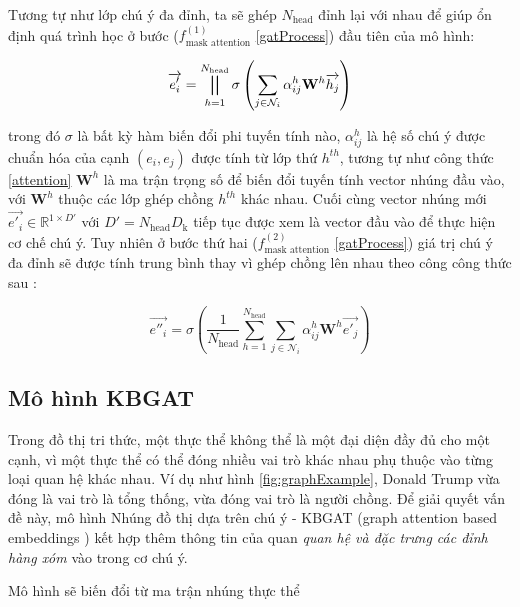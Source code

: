 Tương tự như lớp chú ý đa đỉnh, ta sẽ ghép $N_{\text{head}}$ đỉnh lại với nhau để giúp ổn định quá trình học ở bước ($f_{\text{mask attention}}^{(1)}$ \ref{gatProcess}) đầu tiên của mô hình:

\begin{equation}
\label{multiHeadAttention}
{\overrightarrow{e'_i}}={\bigparallel_{h=1}^{N_{\text{head}}}\sigma\left(\sum_{j\in \mathcal{N}_i}\alpha_{ij}^{h} \mathbf{W}^{h} \overrightarrow{h_{j}} \right)}
\end{equation}

trong đó $\sigma$ là bất kỳ hàm biến đổi phi tuyến tính nào, $\alpha_{ij}^h$ là hệ số chú ý được chuẩn hóa của cạnh $(e_i, e_j)$ được tính từ lớp thứ $h^{th}$, tương tự như công thức \ref{attention} $\mathbf{W}^h$ là ma trận trọng số để biến đổi tuyến tính vector nhúng đầu vào, với $\mathbf{W}^h$ thuộc các lớp ghép chồng $h^{th}$ khác nhau. Cuối cùng vector nhúng mới $\overrightarrow{e'_i} \in \mathbb{R}^{1 \times D'}$ với $D' = N_{\text{head}} D_{\text{k}}$ tiếp tục được xem là vector đầu vào để thực hiện cơ chế chú ý. Tuy nhiên ở bước thứ hai ($f_{\text{mask attention}}^{(2)}$ \ref{gatProcess}) giá trị chú ý đa đỉnh sẽ được tính trung bình thay vì ghép chồng lên nhau theo công công thức sau :

\begin{equation}
\label{multiHeadConcat}
{\overrightarrow{e''_i}}={\sigma\left(\frac{1}{N_{\text{head}}} \sum_{h=1}^{N_{\text{head}}}\sum_{j\in \mathcal{N}_i}\alpha_{ij}^{h} \mathbf{W}^{h} \overrightarrow{e'_{j}} \right)}
\end{equation}

\subsection{Mô hình KBGAT}

Trong đồ thị tri thức, một thực thể không thể là một đại diện đầy đủ cho một cạnh, vì một thực thể có thể đóng nhiều vai trò khác nhau phụ thuộc vào từng loại quan hệ khác nhau. Ví dụ như hình \ref{fig:graphExample}, Donald Trump vừa đóng là vai trò là tổng thống, vừa đóng vai trò là người chồng. Để giải quyết vấn đề này, mô hình Nhúng đồ thị dựa trên chú ý - KBGAT (graph attention based embeddings \cite{nathani2019learning}) kết hợp thêm thông tin của quan \textit{quan hệ và đặc trưng các đỉnh hàng xóm} vào trong cơ chú ý.

Mô hình sẽ biến đổi từ ma trận nhúng thực thể

